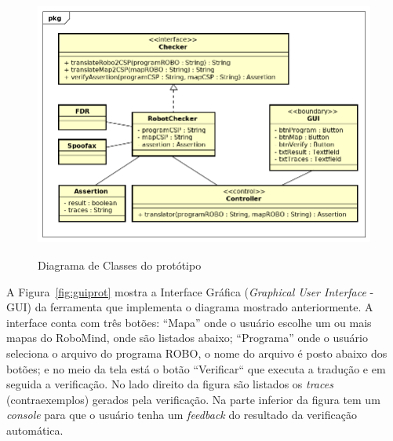 

\begin{figure}[!h]
\centering
\caption{Diagrama de Classes do protótipo}
\includegraphics[height=8cm]{figuras/class_diagram.png}
\label{fig:diagrama}
\end{figure}

A Figura~\ref{fig:guiprot} mostra a Interface Gráfica (\textit{Graphical User Interface} - GUI) da ferramenta que implementa o diagrama mostrado anteriormente. A interface conta com três botões: ``Mapa'' onde o usuário escolhe um ou mais mapas do RoboMind, onde são listados abaixo; ``Programa'' onde o usuário seleciona o arquivo do programa ROBO, o nome do arquivo é posto abaixo dos botões; e no meio da tela está o botão ``Verificar`` que executa a tradução e em seguida a verificação. No lado direito da figura são listados os \textit{traces} (contraexemplos) gerados pela verificação. Na parte inferior da figura tem um \textit{console} para que o usuário tenha um \textit{feedback} do resultado da verificação automática.

